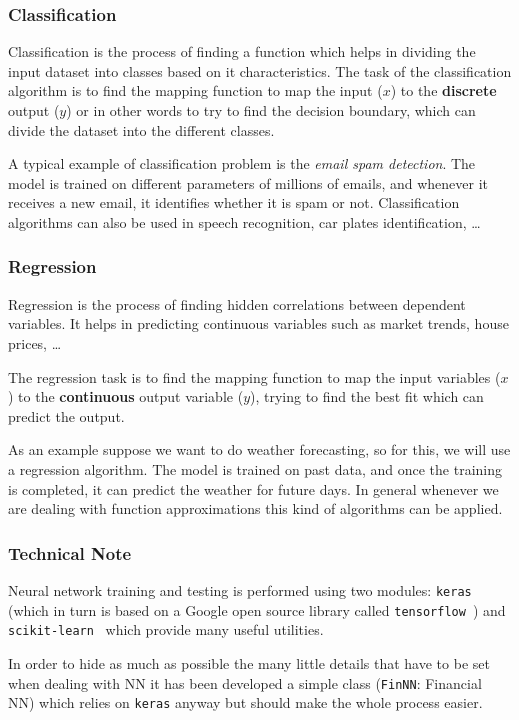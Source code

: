 \subsubsection{Classification}
\label{classification}

Classification is the process of finding a function which helps in dividing the input dataset into classes based on it characteristics. 
The task of the classification algorithm is to find the mapping function to map the input (\(x\)) to the \textbf{discrete} output (\(y\)) or in other words to try to find the decision boundary, which can divide the dataset into the different classes.

A typical example of classification problem is the \emph{email spam detection}. The model is trained on different parameters of millions of emails, and whenever it receives a new email, it identifies whether it is spam or not. Classification algorithms can also be used in speech recognition, car plates identification, \ldots

\subsubsection{Regression}
\label{regression}

Regression is the process of finding hidden correlations between dependent variables. It helps in predicting continuous variables such as market trends, house prices, \ldots

The regression task is to find the mapping function to map the input variables (\(x\)) to the \textbf{continuous} output variable (\(y\)), trying to find the best fit which can predict the output.

As an example suppose we want to do weather forecasting, so for this, we will use a regression algorithm. The model is trained on past data, and once the training is completed, it can predict the weather for future days. In general whenever we are dealing with function approximations this kind of algorithms can be applied.

\begin{attention}
\subsubsection{Technical Note}\label{technical-note}

Neural network training and testing is performed using two modules: \texttt{keras}~\cite{bib:keras} (which in turn is based on a Google open source library called \texttt{tensorflow}~\cite{bib:tensorflow}) and \texttt{scikit-learn}~\cite{bib:scikit} which provide many useful utilities.

In order to hide as much as possible the many little details that have to be set when dealing with NN it has been developed a simple class (\texttt{FinNN}: Financial NN) which relies on \texttt{keras} anyway but should make the whole process easier.
\end{attention}

